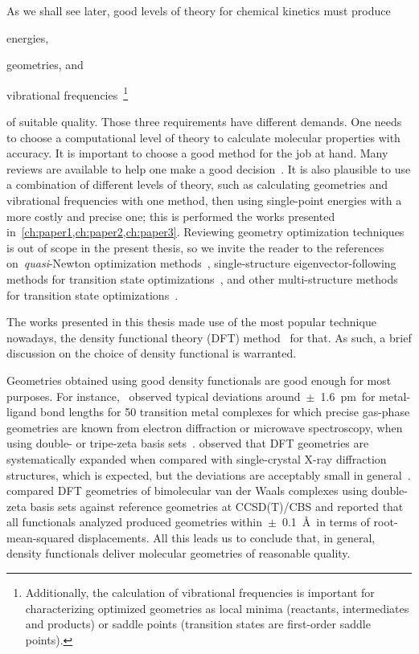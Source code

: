 As we shall see later,
good levels of theory for chemical kinetics
must produce
\begin{enumerate*}
	\item energies,
	\item geometries,
	      and
	\item vibrational frequencies~\footnote{Additionally,
		      the calculation of vibrational frequencies
		      is important for characterizing optimized geometries
		      as local minima (reactants,
		      intermediates and products)
		      or saddle points (transition states are first-order saddle points).}
\end{enumerate*}
of suitable quality.
Those three requirements have different demands.
One needs to choose a computational level of theory to calculate
molecular properties with accuracy.
It is important to choose a good method for the job at hand.
Many reviews are available to help one make a good decision~\cite{Goerigk_2011,Goerigk_2019,Mardirossian_2017,Morgante_2020,Bursch_2022}.
It is also plausible to use a combination of different levels of theory,
such as calculating geometries and vibrational frequencies with one method,
then using single-point energies with a more costly and precise one;
this is performed the works presented in~\cref{ch:paper1,ch:paper2,ch:paper3}.
Reviewing geometry optimization techniques is out of scope in the present
thesis,
so we invite the reader to the references
on~\emph{quasi}-Newton optimization methods~\cite{Banerjee_1985,Schlegel_1987},
single-structure eigenvector-following methods for transition state optimizations~\cite{Banerjee_1985,Schlegel_1987,Mauro_2005},
and other multi-structure methods
for transition state optimizations~\cite{Peng_1993,Peng_1996,Henkelman_2000a,Henkelman_2000b,Henkelman_2002,Sheppard_2008,Zimmerman_2013a,Zimmerman_2013b,Zimmerman_2015,Jafari_2017}.

The works presented in this thesis made use of the most popular technique nowadays,
the density functional theory (DFT)
method~\cite{Hohenberg_1964,Kohn_1965,Perdew_2014,Kryachko_2014,Yu_2016} for
that.
As such,
a brief discussion on the choice of density functional is warranted.

Geometries obtained using good density functionals are good enough
for most purposes.
For instance,~\citeauthor{Bühl_2006} observed typical deviations around~$\pm$~1.6~pm~for
metal-ligand bond lengths for 50 transition metal complexes for which precise gas-phase geometries
are known from electron diffraction or microwave spectroscopy,
when using double- or tripe-zeta basis sets~\cite{Bühl_2006}.
\citeauthor{Minenkov_2012} observed that
DFT geometries are systematically expanded when compared with single-crystal
X-ray diffraction structures,
which is expected,
but the deviations are
acceptably small in general~\cite{Minenkov_2012}.
\citeauthor{Sirianni_2018} compared DFT geometries of bimolecular van der Waals complexes using
double-zeta basis sets against reference geometries at CCSD(T)/CBS
and reported that all functionals analyzed produced
geometries within~$\pm$~0.1~\AA{}~in terms
of root-mean-squared displacements.
All this leads us to conclude that,
in general,
density functionals deliver molecular geometries of reasonable quality.

